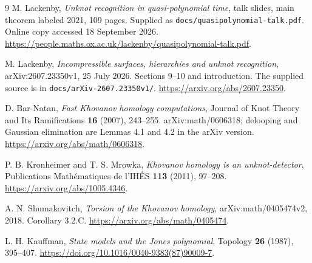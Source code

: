 \documentclass[11pt]{article}
\theoremstyle{remark}\newtheorem{remark}[theorem]{Remark}
\newcommand{\code}[1]{\texttt{\small #1}}
\begin{document}
\begin{thebibliography}{9}
M. Lackenby, \emph{Unknot recognition in quasi-polynomial time}, talk slides,
main theorem labeled 2021, 109 pages. Supplied as
\code{docs/quasipolynomial-talk.pdf}. Online copy accessed 18 September 2026.
\url{https://people.maths.ox.ac.uk/lackenby/quasipolynomial-talk.pdf}.

M. Lackenby, \emph{Incompressible surfaces, hierarchies and unknot recognition},
arXiv:2607.23350v1, 25 July 2026. Sections 9--10 and introduction.
The supplied source is in \code{docs/arXiv-2607.23350v1/}.
\url{https://arxiv.org/abs/2607.23350}.

D. Bar-Natan, \emph{Fast Khovanov homology computations},
Journal of Knot Theory and Its Ramifications \textbf{16} (2007), 243--255.
arXiv:math/0606318; delooping and Gaussian elimination are Lemmas 4.1 and
4.2 in the arXiv version.
\url{https://arxiv.org/abs/math/0606318}.

P. B. Kronheimer and T. S. Mrowka, \emph{Khovanov homology is an
unknot-detector}, Publications Math\'ematiques de l'IH\'ES \textbf{113}
(2011), 97--208. \url{https://arxiv.org/abs/1005.4346}.

A. N. Shumakovitch, \emph{Torsion of the Khovanov homology},
arXiv:math/0405474v2, 2018. Corollary 3.2.C.
\url{https://arxiv.org/abs/math/0405474}.

L. H. Kauffman, \emph{State models and the Jones polynomial},
Topology \textbf{26} (1987), 395--407.
\url{https://doi.org/10.1016/0040-9383(87)90009-7}.
\end{thebibliography}
\end{document}
